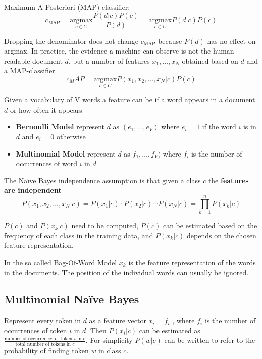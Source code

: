 \documentclass[11pt]{article}
\begin{document}
\noindent
Maximum A Posteriori (MAP) classifier:
\begin{equation*}
	c_{\text{MAP}} = \underset{c\in C}{\text{argmax}} \frac{P(d|c) P(c)}{P(d)} = \underset{c\in C}{\text{argmax}} P(d|c) P(c)
\end{equation*}

Dropping the denominator does not change $c_{\text{MAP}}$ because $P(d)$ has no effect on argmax. In practice, the evidence a machine can observe is not the human-readable document $d$, but a number of features $x_1,\dots,x_N$ obtained based on $d$ and a MAP-classifier
\begin{equation*}
	c_MAP = \underset{c\in C}{\text{argmax}} P(x_1, x_2, \dots , x_N | c) P(c)
\end{equation*}

\noindent
Given a vocabulary of V words a feature can be if a word appears in a document $d$ or how often it appears
\begin{itemize}
	\item \textbf{Bernoulli Model} represent $d$ as $(e_1, \dots, e_V)$ where $e_i =1$ if the word $i$ is in $d$ and $e_i = 0$ otherwise
	\item \textbf{Multinomial Model} represent $d$ as $f_1, \dots, f_V)$ where $f_i$ is the number of occurrences of word $i$ in $d$
\end{itemize}

The Naïve Bayes independence assumption is that given a class $c$ the \textbf{features are independent}
\begin{equation*}
	P(x_1, x_2, \dots , x_N | c) = P(x_1|c)\cdot P(x_2|c) \cdots P(x_N|c) = \prod_{k=1}^{n}P(x_k|c)
\end{equation*}

$P(c)$ and $P(x_k|c)$ need to be computed, $P(c)$ can be estimated based on the frequency of each class in the training data, and $P(x_k|c)$ depends on the chosen feature representation.

In the so called Bag-Of-Word Model $x_k$ is the feature representation of the words in the documents. The position of the individual words can usually be ignored.

\subsection{Multinomial Naïve Bayes}
Represent every token in $d$ as a feature vector $x_i = f_i$ , where $f_i$ is the number of occurrences of token $i$ in $d$. Then $P(x_i|c)$ can be estimated as $\frac{\text{number of occurrences of token }i\text{ in }c}{\text{total number of tokens in }c}$. For simplicity $P(w|c)$ can be written to refer to the probability of finding token $w$ in class $c$.
\end{document}

